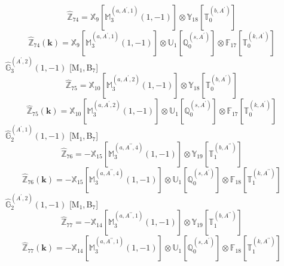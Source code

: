 \documentclass[fleqn,10pt,landscape]{article}
\begin{document}
\begin{itemize}
\begin{dmath*}
\hat{\mathbb{Z}}_{74}=\mathbb{X}_{9}[\mathbb{M}_{3}^{(a,A^{\prime},1)}(1,-1)] \otimes\mathbb{Y}_{18}[\mathbb{T}_{0}^{(b,A^{\prime})}]
\end{dmath*}
\begin{dmath*}
\hat{\mathbb{Z}}_{74}(\bm{k})=\mathbb{X}_{9}[\mathbb{M}_{3}^{(a,A^{\prime},1)}(1,-1)] \otimes\mathbb{U}_{1}[\mathbb{Q}_{0}^{(s,A^{\prime})}] \otimes\mathbb{F}_{17}[\mathbb{T}_{0}^{(k,A^{\prime})}]
\end{dmath*}
\vspace{4mm}
\noindent {} $\,\,\,\hat{\mathbb{G}}_{3}^{(A^{\prime},2)}(1,-1)$ [M$_{1}$,\,B$_{7}$]
\begin{dmath*}
\hat{\mathbb{Z}}_{75}=\mathbb{X}_{10}[\mathbb{M}_{3}^{(a,A^{\prime},2)}(1,-1)] \otimes\mathbb{Y}_{18}[\mathbb{T}_{0}^{(b,A^{\prime})}]
\end{dmath*}
\begin{dmath*}
\hat{\mathbb{Z}}_{75}(\bm{k})=\mathbb{X}_{10}[\mathbb{M}_{3}^{(a,A^{\prime},2)}(1,-1)] \otimes\mathbb{U}_{1}[\mathbb{Q}_{0}^{(s,A^{\prime})}] \otimes\mathbb{F}_{17}[\mathbb{T}_{0}^{(k,A^{\prime})}]
\end{dmath*}
\vspace{4mm}
\noindent {} $\,\,\,\hat{\mathbb{G}}_{2}^{(A^{\prime},1)}(1,-1)$ [M$_{1}$,\,B$_{7}$]
\begin{dmath*}
\hat{\mathbb{Z}}_{76}=- \mathbb{X}_{15}[\mathbb{M}_{3}^{(a,A^{\prime\prime},4)}(1,-1)] \otimes\mathbb{Y}_{19}[\mathbb{T}_{1}^{(b,A^{\prime\prime})}]
\end{dmath*}
\begin{dmath*}
\hat{\mathbb{Z}}_{76}(\bm{k})=- \mathbb{X}_{15}[\mathbb{M}_{3}^{(a,A^{\prime\prime},4)}(1,-1)] \otimes\mathbb{U}_{1}[\mathbb{Q}_{0}^{(s,A^{\prime})}] \otimes\mathbb{F}_{18}[\mathbb{T}_{1}^{(k,A^{\prime\prime})}]
\end{dmath*}
\vspace{4mm}
\noindent {} $\,\,\,\hat{\mathbb{G}}_{2}^{(A^{\prime},2)}(1,-1)$ [M$_{1}$,\,B$_{7}$]
\begin{dmath*}
\hat{\mathbb{Z}}_{77}=- \mathbb{X}_{14}[\mathbb{M}_{3}^{(a,A^{\prime\prime},1)}(1,-1)] \otimes\mathbb{Y}_{19}[\mathbb{T}_{1}^{(b,A^{\prime\prime})}]
\end{dmath*}
\begin{dmath*}
\hat{\mathbb{Z}}_{77}(\bm{k})=- \mathbb{X}_{14}[\mathbb{M}_{3}^{(a,A^{\prime\prime},1)}(1,-1)] \otimes\mathbb{U}_{1}[\mathbb{Q}_{0}^{(s,A^{\prime})}] \otimes\mathbb{F}_{18}[\mathbb{T}_{1}^{(k,A^{\prime\prime})}]
\end{dmath*}

\end{itemize}
\end{document}

